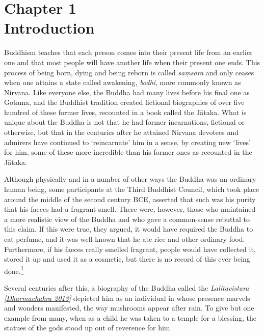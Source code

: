 \label{footprints_split_004.html_calibre_pb_9}

\label{footprints_split_005.html}{}

\section{\texorpdfstring{{Chapter 1}\\
Introduction}{Chapter 1 Introduction}}\label{footprints_split_005.html_TOCTarget1}

Buddhism teaches that each person comes into their present life from an
earlier one and that most people will have another life when their
present one ends. This process of being born, dying and being reborn is
called \emph{saṃsāra} and only ceases when one attains a state called
awakening, \emph{bodhi}, more commonly known as Nirvana. Like everyone
else, the Buddha had many lives before his final one as Gotama, and the
Buddhist tradition created fictional biographies of over five hundred of
these former lives, recounted in a book called the Jātaka. What is
unique about the Buddha is not that he had former incarnations,
fictional or otherwise, but that in the centuries after he attained
Nirvana devotees and admirers have continued to `reincarnate' him in a
sense, by creating new `lives' for him, some of these more incredible
than his former ones as recounted in the Jātaka.

Although physically and in a number of other ways the Buddha was an
ordinary human being, some participants at the Third Buddhist Council,
which took place around the middle of the second century BCE, asserted
that such was his purity that his faeces had a fragrant smell. There
were, however, those who maintained a more realistic view of the Buddha
and who gave a common-sense rebuttal to this claim. If this were true,
they argued, it would have required the Buddha to eat perfume, and it
was well-known that he ate rice and other ordinary food. Furthermore, if
his faeces really smelled fragrant, people would have collected it,
stored it up and used it as a cosmetic, but there is no record of this
ever being
done.\label{footprints_split_005.html_fnref1}\hyperref[footprints_split_024.htmlux5cux23fn1]{\textsuperscript{1}}

Several centuries after this, a biography of the Buddha called the
\emph{{Lalitavistara
{{[}\hyperref[footprints_split_023.htmlux5cux23Dharmachakraux5cux25202013]{Dharmachakra
2013}{]}}}} depicted him as an individual in whose presence marvels and
wonders manifested, the way mushrooms appear after rain. To give but one
example from many, when as a child he was taken to a temple for a
blessing, the statues of the gods stood up out of reverence for him.

